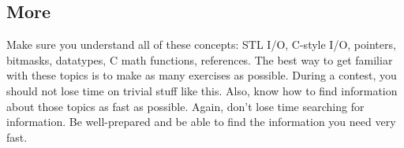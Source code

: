 \subsection{More}

Make sure you understand all of these concepts: STL I/O, C-style I/O, pointers, bitmasks, datatypes, C math functions, references. The best way to get familiar with these topics is to make as many exercises as possible. During a contest, you should not lose time on trivial stuff like this. 
Also, know how to find information about those topics as fast as possible. Again, don't lose time searching for information. Be well-prepared and be able to find the information you need very fast.
